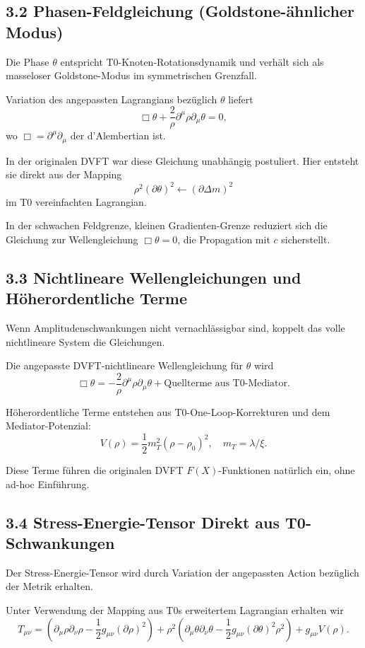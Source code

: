 	\subsection{3.2 Phasen-Feldgleichung (Goldstone-ähnlicher Modus)}
	
	Die Phase $\theta$ entspricht T0-Knoten-Rotationsdynamik und verhält sich als masseloser Goldstone-Modus im symmetrischen Grenzfall.
	
	Variation des angepassten Lagrangians bezüglich $\theta$ liefert
	\[
	\Box \theta + \frac{2}{\rho} \partial^\mu \rho \partial_\mu \theta = 0,
	\]
	wo $\Box = \partial^\mu \partial_\mu$ der d'Alembertian ist.
	
	In der originalen DVFT war diese Gleichung unabhängig postuliert. Hier entsteht sie direkt aus der Mapping
	\[
	\rho^2 (\partial \theta)^2 \leftarrow (\partial \Delta m)^2
	\]
	im T0 vereinfachten Lagrangian.
	
	In der schwachen Feldgrenze, kleinen Gradienten-Grenze reduziert sich die Gleichung zur Wellengleichung $\Box \theta = 0$, die Propagation mit $c$ sicherstellt.
	
	\subsection{3.3 Nichtlineare Wellengleichungen und Höherordentliche Terme}
	
	Wenn Amplitudenschwankungen nicht vernachlässigbar sind, koppelt das volle nichtlineare System die Gleichungen.
	
	Die angepasste DVFT-nichtlineare Wellengleichung für $\theta$ wird
	\[
	\Box \theta = -\frac{2}{\rho} \partial^\mu \rho \partial_\mu \theta + \text{Quellterme aus T0-Mediator}.
	\]
	
	Höherordentliche Terme entstehen aus T0-One-Loop-Korrekturen und dem Mediator-Potenzial:
	\[
	V(\rho) = \frac{1}{2} m_T^2 (\rho - \rho_0)^2, \quad m_T = \lambda / \xi.
	\]
	
	Diese Terme führen die originalen DVFT $F(X)$-Funktionen natürlich ein, ohne ad-hoc Einführung.
	
	\subsection{3.4 Stress-Energie-Tensor Direkt aus T0-Schwankungen}
	
	Der Stress-Energie-Tensor wird durch Variation der angepassten Action bezüglich der Metrik erhalten.
	
	Unter Verwendung der Mapping aus T0s erweitertem Lagrangian erhalten wir
	\[
	T_{\mu\nu} = (\partial_\mu \rho \partial_\nu \rho - \frac{1}{2} g_{\mu\nu} (\partial \rho)^2) + \rho^2 (\partial_\mu \theta \partial_\nu \theta - \frac{1}{2} g_{\mu\nu} (\partial \theta)^2 \rho^2) + g_{\mu\nu} V(\rho).
	\]
	
